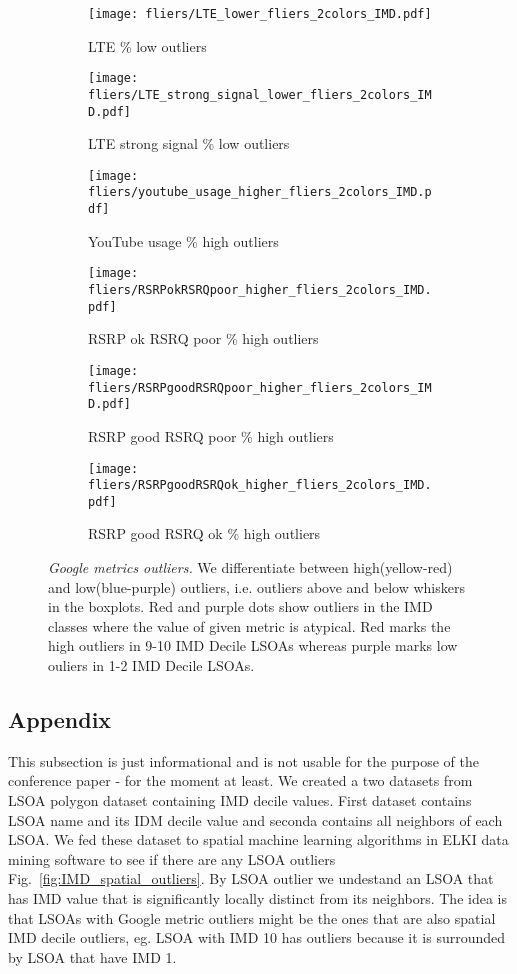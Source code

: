 \begin{figure*}
\centering
	\begin{subfigure}[b]{0.3	\linewidth}
		\texttt{[image: fliers/LTE\_lower\_fliers\_2colors\_IMD.pdf]}
		\caption{\scriptsize{LTE \% low outliers}}
	\end{subfigure}	
	\begin{subfigure}[b]{0.3	\linewidth}
		\texttt{[image: fliers/LTE\_strong\_signal\_lower\_fliers\_2colors\_IMD.pdf]}
		\caption{\scriptsize{LTE strong signal \% low outliers}}
	\end{subfigure}
	\begin{subfigure}[b]{0.3	\linewidth}
		\texttt{[image: fliers/youtube\_usage\_higher\_fliers\_2colors\_IMD.pdf]}
		\caption{\scriptsize{YouTube usage \% high outliers}}
	\end{subfigure}
	\begin{subfigure}[b]{0.3	\linewidth}
		\texttt{[image: fliers/RSRPokRSRQpoor\_higher\_fliers\_2colors\_IMD.pdf]}
		\caption{\scriptsize{RSRP ok RSRQ poor \% high outliers}}
	\end{subfigure}	
	\begin{subfigure}[b]{0.3	\linewidth}
		\texttt{[image: fliers/RSRPgoodRSRQpoor\_higher\_fliers\_2colors\_IMD.pdf]}
		\caption{\scriptsize{RSRP good RSRQ poor \% high outliers}}
	\end{subfigure}
	\begin{subfigure}[b]{0.3	\linewidth}
		\texttt{[image: fliers/RSRPgoodRSRQok\_higher\_fliers\_2colors\_IMD.pdf]}
		\caption{\scriptsize{RSRP good RSRQ ok \% high outliers}}
	\end{subfigure}
\caption{\textit{Google metrics outliers.} We differentiate between high(yellow-red) and low(blue-purple) outliers, i.e. outliers above and below whiskers in the boxplots. Red and purple dots show outliers in the IMD classes where the value of given metric is atypical. Red marks the high outliers in 9-10 IMD Decile LSOAs whereas purple marks low ouliers in 1-2 IMD Decile LSOAs.}
\label{fig:google_metrics_outliers}
\end{figure*}

\subsection{Appendix}
This subsection is just informational and is not usable for the purpose of the conference paper - for the moment at least.
We created a two datasets from LSOA polygon dataset containing IMD decile values. First dataset contains LSOA name and its IDM decile value and seconda contains all neighbors of each LSOA. We fed these dataset to spatial machine learning algorithms in ELKI data mining software to see if there are any LSOA outliers Fig.~\ref{fig:IMD_spatial_outliers}. By LSOA outlier we undestand an LSOA that has IMD value that is significantly locally distinct from its neighbors. The idea is that LSOAs with Google metric outliers might be the ones that are also spatial IMD decile outliers, eg. LSOA with IMD 10 has outliers because it is surrounded by LSOA that have IMD 1.

